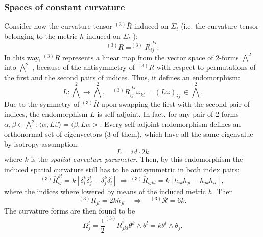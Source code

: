 	\subsubsection{Spaces of constant curvature}
	Consider now the curvature tensor $^{(3)}\bar{R}$ induced on $\Sigma_t$  (i.e. the curvature
	tensor belonging to the metric $h$ induced on $\Sigma_t$ ):
	\begin{equation}
		^{(3)} \bar{R} = ^{(3)}\bar{R}^{\;\, kl}_{ij}.
	\end{equation}
	In this way, $^{(3)} \bar{R}$ represents a linear map from the vector space of 2-forms $\bigwedge^2$into $\bigwedge^2$ , because of the antisymmetry of $^{(3)}\bar{R}$ with respect to
	permutations of the first and the second pairs of indices. Thus, it defines
	an endomorphism:
	\begin{equation}
		L:\bigwedge^{\,2} \rightarrow \bigwedge^{\,2}, \quad ^{(3)} \bar{R}^{\,\,kl}_{ij} \omega_{kl} = (L\omega)_{ij} \, \in \bigwedge^2.
	\end{equation}
	Due to the symmetry of $^{(3)}\bar{R}$ upon swapping the first with the
	second pair of indices, the endomorphism $L$ is self-adjoint. In fact, for any pair of 2-forms $α, β \in \bigwedge^2: \langle \alpha, L \beta \rangle = \langle \beta, L \alpha>$. Every self-adjoint endomorphism defines an orthonormal set of eigenvectors (3 of them), which have all the same eigenvalue by isotropy assumption:
	\begin{equation}
		L = id \cdot 2 k
	\end{equation}
	where $k$ is the \emph{spatial curvature parameter}.
	Then, by this endomorphism the induced spatial curvature still has to be antisymmetric in both index pairs:
	\begin{equation}
		^{(3)}\bar{R}_{ij}^{kl} = k \left[\delta^k_i \delta^l_j - \delta^k_j \delta^l_i \right]\, \Rightarrow \, ^{(3)}\bar{R}_{ijkl} = k \left[h_{ik} h_{jl} - h_{jk} h_{il}\right],
	\end{equation}
	where the indices where lowered by means of the induced metric $h$. Then
	\begin{equation}
		^{(3)}R_{jl} = 2 k h_{jl} \quad \Rightarrow \quad ^{(3)} \mathcal{R}= 6 k.
	\end{equation}
	The curvature forms are then found to be
	\begin{equation}
		\Omega^i_j = \frac{1}{2} ^{(3)} \bar{R}^i_{jkl} \theta^k \wedge \theta^l = k \theta^i \wedge \theta_j.
	\end{equation}
	

